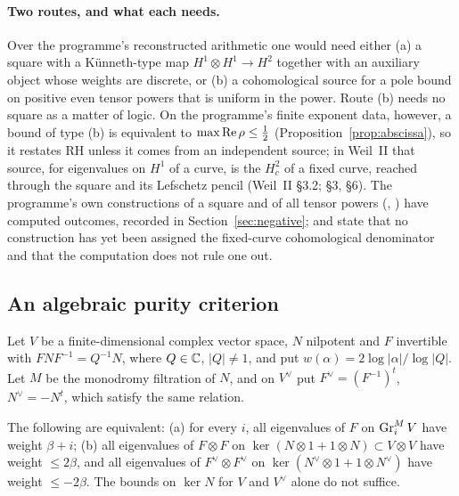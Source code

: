 \paragraph{Two routes, and what each needs.}
Over the programme's reconstructed arithmetic one would need either (a) a square with a Künneth-type map $H^1\otimes H^1\to H^2$ together with an auxiliary object whose weights are discrete, or (b) a cohomological source for a pole bound on positive even tensor powers that is uniform in the power.
Route (b) needs no square as a matter of logic. On the programme's finite exponent data, however, a bound of type (b) is equivalent to $\max\operatorname{Re}\rho\le\tfrac12$ (Proposition~\ref{prop:abscissa}), so it restates RH unless it comes from an independent source; in Weil~II that source, for eigenvalues on $H^1$ of a curve, is the $H^2_c$ of a fixed curve, reached through the square and its Lefschetz pencil (Weil~II §3.2;  §3,  §6).
The programme's own constructions of a square and of all tensor powers (, ) have computed outcomes, recorded in Section~\ref{sec:negative};  and  state that no construction has yet been assigned the fixed-curve cohomological denominator and that the computation does not rule one out.

\subsection{An algebraic purity criterion}

Let $V$ be a finite-dimensional complex vector space, $N$ nilpotent and $F$ invertible with $FNF^{-1}=Q^{-1}N$, where $Q\in\mathbb{C}$, $|Q|\ne1$, and put $w(\alpha)=2\log|\alpha|/\log|Q|$. Let $M$ be the monodromy filtration of $N$, and on $V^\vee$ put $F^\vee=(F^{-1})^t$, $N^\vee=-N^t$, which satisfy the same relation.

\begin{proposition}\label{prop:purity}
The following are equivalent:
(a) for every $i$, all eigenvalues of $F$ on $\operatorname{Gr}^M_iV$ have weight $\beta+i$;
(b) all eigenvalues of $F\otimes F$ on $\ker(N\otimes1+1\otimes N)\subset V\otimes V$ have weight $\le2\beta$, and all eigenvalues of $F^\vee\otimes F^\vee$ on $\ker(N^\vee\otimes1+1\otimes N^\vee)$ have weight $\le-2\beta$.
The bounds on $\ker N$ for $V$ and $V^\vee$ alone do not suffice.
\end{proposition}

